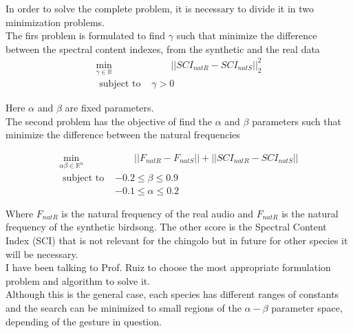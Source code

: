 \documentclass{article}
\begin{document}
    
    In order to solve the complete problem, it is necessary to divide it in two minimization problems.\\
    
    The firs problem is formulated to find $\gamma$ such that minimize the difference between the  spectral content indexes, from the synthetic and the real data
    \begin{equation}
    \begin{aligned}
    \underset{\gamma \in \mathbb{R}}{\text{min}} &\qquad || SCI_{natR} - SCI_{natS}||_2^2\\
    \text { subject to } &  \gamma > 0
    \end{aligned}
    \end{equation}
    
    Here $\alpha$ and $\beta$ are fixed parameters.\\
    
    The second problem has the objective of find the $\alpha$ and $\beta$ parameters such that minimize the difference between the natural frequencies
    
    \begin{equation}
    \begin{aligned}
    \underset{\alpha \beta \in \mathbb{R}^n}{\text{min}} &\qquad || F_{natR} - F_{natS}|| + || SCI_{natR} - SCI_{natS}||\\
    \text { subject to } & -0.2\leq\beta \leq 0.9\\
     & -0.1 \leq \alpha \leq 0.2
    \end{aligned}
    \end{equation}
    
    
    Where $F_{natR}$ is the natural frequency of the real audio and $F_{natR}$ is the natural frequency of the synthetic birdsong. The other score is the Spectral Content Index (SCI) that is not relevant for the chingolo but in future for other species it will be necessary.\\
    
    
    
    I have been talking to Prof. Ruiz to choose the most appropriate  formulation problem and algorithm to solve it.\\
    
    
    Although this is the general case, each species has different ranges of constants and the search can be minimized to small regions of the $\alpha - \beta$ parameter space, depending of the gesture in question.  \\
    
\end{document}
